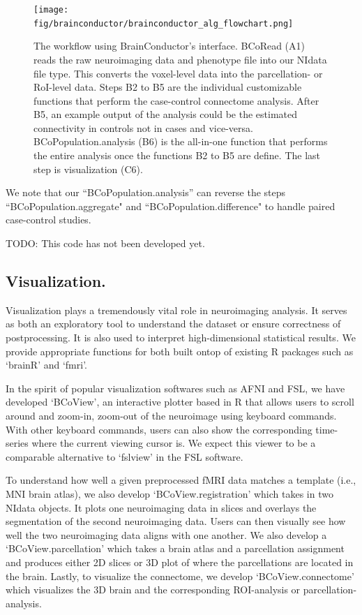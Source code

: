 \documentclass{nature}
\begin{document}
\begin{figure}[tb]
\centering
\texttt{[image: fig/brainconductor/brainconductor\_alg\_flowchart.png]}
\caption{The workflow using BrainConductor's interface. BCoRead (A1) reads the raw neuroimaging
data and phenotype file into our NIdata file type. This
converts the voxel-level data into the parcellation- or RoI-level
data. Steps B2 to B5 are the individual 
customizable functions that perform the case-control connectome analysis.
After B5, an example output of the analysis could be
the estimated connectivity in controls not in cases and vice-versa.
 BCoPopulation.analysis (B6) is the all-in-one function that performs the entire analysis
once the functions B2 to B5 are define. The last step is visualization (C6).}
\label{fig:flowchart}
\end{figure}

We note that our ``BCoPopulation.analysis'' can reverse the steps ``BCoPopulation.aggregate"
and ``BCoPopulation.difference" to handle paired case-control studies.

{\color{red}TODO: This code has not been developed yet.}

\subsection{Visualization.}
Visualization plays a tremendously vital role in neuroimaging analysis. 
It serves as both an exploratory tool to understand the dataset or ensure
correctness
of postprocessing. It is also used to interpret high-dimensional statistical
results.
We provide appropriate functions for both built ontop of existing R packages
such
as `brainR' and `fmri'. 

In the spirit of popular visualization softwares such as AFNI and FSL, we have
developed `BCoView', an interactive plotter based in R that allows users to
scroll around and
zoom-in, zoom-out of the neuroimage using keyboard commands. With other keyboard
commands, users can also show the corresponding time-series where the current
viewing
cursor is. We expect this viewer to be a comparable alternative to `fslview' in
the FSL
software. 

To understand how well a given preprocessed fMRI data matches a template (i.e.,
MNI brain
atlas), we also develop `BCoView.registration' which takes in two NIdata
objects.
It plots one neuroimaging data in slices and overlays the segmentation of the
second
neuroimaging data. Users can then visually see how well the two neuroimaging
data aligns
with one another. We also develop a `BCoView.parcellation' which takes a brain
atlas and
a parcellation assignment and produces either 2D slices or 3D plot of where the
parcellations
are located in the brain.
Lastly, to visualize the connectome, we develop `BCoView.connectome' which
visualizes the 
3D brain and the corresponding ROI-analysis or parcellation-analysis.
\end{document}
